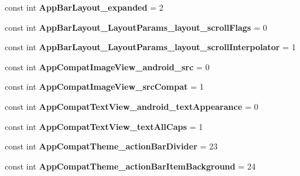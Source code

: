\begin{DoxyCompactItemize}
\mbox{\label{classXaria_1_1Resource_1_1Styleable_a7c9e54e69ba83a2e490217b8ab2ddcfb}} 
const int {\bfseries App\+Bar\+Layout\+\_\+expanded} = 2
\item 
\mbox{\label{classXaria_1_1Resource_1_1Styleable_ab44d079a1138bd87e427045cad19d2d3}} 
const int {\bfseries App\+Bar\+Layout\+\_\+\+Layout\+Params\+\_\+layout\+\_\+scroll\+Flags} = 0
\item 
\mbox{\label{classXaria_1_1Resource_1_1Styleable_a79a8951eb81903d257b3f0911cbd15d6}} 
const int {\bfseries App\+Bar\+Layout\+\_\+\+Layout\+Params\+\_\+layout\+\_\+scroll\+Interpolator} = 1
\item 
\mbox{\label{classXaria_1_1Resource_1_1Styleable_a3f8406d5daef7a75f206ddd61243c426}} 
const int {\bfseries App\+Compat\+Image\+View\+\_\+android\+\_\+src} = 0
\item 
\mbox{\label{classXaria_1_1Resource_1_1Styleable_a5aadc1cb069b5ed8dc962e63c93b02f3}} 
const int {\bfseries App\+Compat\+Image\+View\+\_\+src\+Compat} = 1
\item 
\mbox{\label{classXaria_1_1Resource_1_1Styleable_a8ec3896c5c5b32e16a9880766722863f}} 
const int {\bfseries App\+Compat\+Text\+View\+\_\+android\+\_\+text\+Appearance} = 0
\item 
\mbox{\label{classXaria_1_1Resource_1_1Styleable_af5c66ff6cf1cfa6844b899b3e00928a8}} 
const int {\bfseries App\+Compat\+Text\+View\+\_\+text\+All\+Caps} = 1
\item 
\mbox{\label{classXaria_1_1Resource_1_1Styleable_ae3b9bae32b350731be983717df256098}} 
const int {\bfseries App\+Compat\+Theme\+\_\+action\+Bar\+Divider} = 23
\item 
\mbox{\label{classXaria_1_1Resource_1_1Styleable_aec4834b5fe6ffdd19b7a155e797e3eba}} 
const int {\bfseries App\+Compat\+Theme\+\_\+action\+Bar\+Item\+Background} = 24

\end{DoxyCompactItemize}
